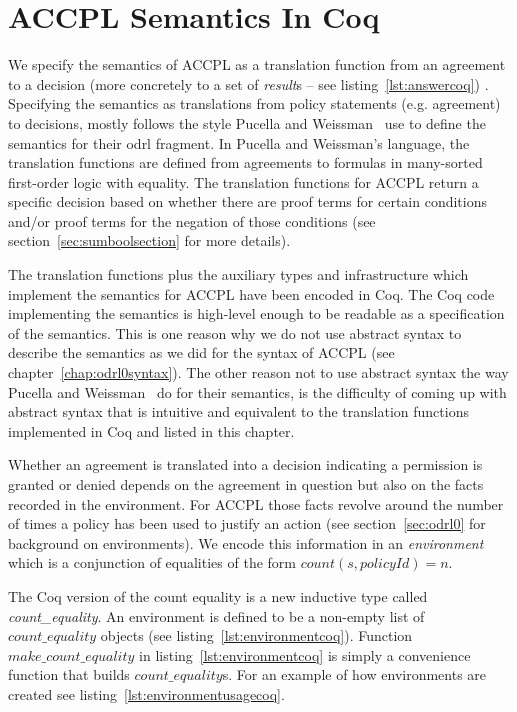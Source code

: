 \chapter{ACCPL Semantics In Coq}\label{chap:accplsemanticscoq}

We specify the semantics of \ac{ACCPL} as a translation function from an agreement to a decision (more concretely to a set of \emph{result}s -- see listing~\ref{lst:answercoq}) . Specifying the semantics as translations from policy statements (e.g. agreement) to decisions, mostly follows the style Pucella and Weissman~\cite{pucella2006} use to define the semantics for their \ac{odrl} fragment. In Pucella and Weissman's language, the translation functions are defined from agreements to formulas in many-sorted first-order logic with equality. The translation functions for \ac{ACCPL} return a specific decision based on whether there are proof terms for certain conditions and/or proof terms for the negation of those conditions (see section~\ref{sec:sumboolsection} for more details).
 

The translation functions plus the auxiliary types and infrastructure which implement the semantics for \ac{ACCPL} have been encoded in Coq. The Coq code implementing the semantics is high-level enough to be readable as a specification of the semantics. This is one reason why we do not use abstract syntax to describe the semantics as we did for the syntax of \ac{ACCPL} (see chapter~\ref{chap:odrl0syntax}). The other reason not to use abstract syntax the way Pucella and Weissman~\cite{pucella2006} do for their semantics, is the difficulty of coming up with abstract syntax that is intuitive and equivalent to the translation functions implemented in Coq and listed in this chapter.

Whether an agreement is translated into a decision indicating a permission is granted or denied depends on the agreement in question but also on the facts recorded in the environment. For \ac{ACCPL} those facts revolve around the number of times a policy has been used to justify an action (see section~\ref{sec:odrl0} for background on environments). We encode this information in an \emph{environment} which is a conjunction of equalities of the form $count(s, policyId) = n$. 

The Coq version of the count equality is a new inductive type called \emph{count\_equality}. An environment is defined to be a non-empty list of $count\_equality$ objects (see listing~\ref{lst:environmentcoq}). Function $make\_count\_equality$ in listing~\ref{lst:environmentcoq} is simply a convenience function that builds $count\_equality$s. For an example of how environments are created see listing~\ref{lst:environmentusagecoq}.


